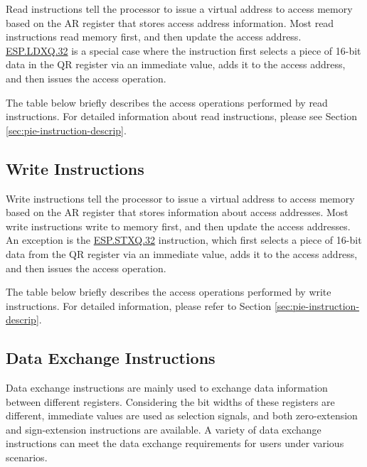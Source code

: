 \documentclass[main\_\_EN.tex]{subfiles}
\begin{document}
Read instructions tell the processor to issue a virtual address to access memory based on the AR register that stores access address information. Most read instructions read memory first, and then update the access address. \hyperref[instruction:ESPLDXQ32]{ESP.LDXQ.32} is a special case where the instruction first selects a piece of 16-bit data in the QR register via an immediate value, adds it to the access address, and then issues the access operation.


The table below briefly describes the access operations performed by read instructions. For detailed information about read instructions, please see Section \ref{sec:pie-instruction-descrip}.

\newpage


\subsection{Write Instructions}
\label{sec:pie-write-instructions}

Write instructions tell the processor to issue a virtual address to access memory based on the AR register that stores information about access addresses. Most write instructions write to memory first, and then update the access addresses. An exception is the \hyperref[instruction:ESPSTXQ32]{ESP.STXQ.32} instruction, which first selects a piece of 16-bit data from the QR register via an immediate value, adds it to the access address, and then issues the access operation.


The table below briefly describes the access operations performed by write instructions. For detailed information, please refer to Section \ref{sec:pie-instruction-descrip}.



\subsection{Data Exchange Instructions}
\label{sec:pie-data-exchange-instructions}

Data exchange instructions are mainly used to exchange data information between different registers. Considering the bit widths of these registers are different, immediate values are used as selection signals, and both zero-extension and sign-extension instructions are available. A variety of data exchange instructions can meet the data exchange requirements for users under various scenarios.
\end{document}

